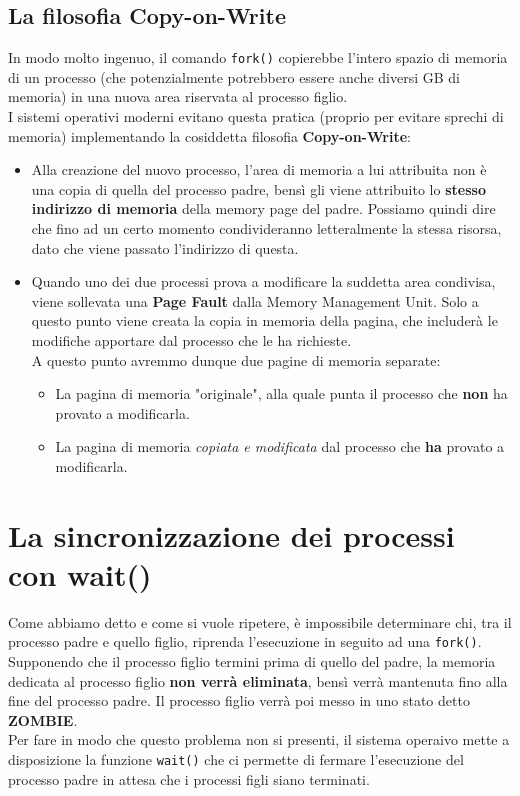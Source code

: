 \documentclass[12pt]{report}
\begin{document}
	\subsection{La filosofia Copy-on-Write}
	In modo molto ingenuo, il comando \texttt{fork()} copierebbe l'intero spazio di memoria di un processo (che potenzialmente potrebbero essere anche diversi GB di memoria) in una nuova area riservata al processo figlio.\\
	I sistemi operativi moderni evitano questa pratica (proprio per evitare sprechi di memoria) implementando la cosiddetta filosofia \textbf{Copy-on-Write}:
	\begin{itemize}
		\item Alla creazione del nuovo processo, l'area di memoria a lui attribuita non è una copia di quella del processo padre, bensì gli viene attribuito lo \textbf{stesso indirizzo di memoria} della memory page del padre. Possiamo quindi dire che fino ad un certo momento condivideranno letteralmente la stessa risorsa, dato che viene passato l'indirizzo di questa.
		
		\item Quando uno dei due processi prova a modificare la suddetta area condivisa, viene sollevata una \textbf{Page Fault} dalla Memory Management Unit. Solo a questo punto viene creata la copia in memoria della pagina, che includerà le modifiche apportare dal processo che le ha richieste.\\
		A questo punto avremmo dunque due pagine di memoria separate:
		\begin{itemize}
			\item La pagina di memoria "originale", alla quale punta il processo che \textbf{non} ha provato a modificarla.
			
			\item La pagina di memoria \textit{copiata e modificata} dal processo che \textbf{ha} provato a modificarla.
		\end{itemize}
	\end{itemize}
	
	\section{La sincronizzazione dei processi con wait()}
	Come abbiamo detto e come si vuole ripetere, è impossibile determinare chi, tra il processo padre e quello figlio, riprenda l'esecuzione in seguito ad una \texttt{fork()}.\\
	Supponendo che il processo figlio termini prima di quello del padre, la memoria dedicata al processo figlio \textbf{non verrà eliminata}, bensì verrà mantenuta fino alla fine del processo padre. Il processo figlio verrà poi messo in uno stato detto \textbf{ZOMBIE}.\\
	Per fare in modo che questo problema non si presenti, il sistema operaivo mette a disposizione la funzione \texttt{wait()} che ci permette di fermare l'esecuzione del processo padre in attesa che i processi figli siano terminati.
	\smallbreak
	
\end{document}
